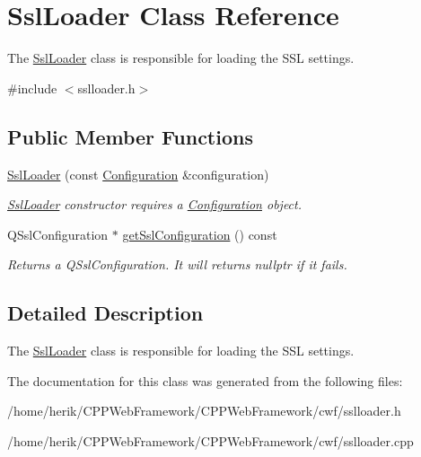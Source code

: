 \hypertarget{class_ssl_loader}{}\section{Ssl\+Loader Class Reference}
\label{class_ssl_loader}


The \hyperlink{class_ssl_loader}{Ssl\+Loader} class is responsible for loading the S\+SL settings.  




{\ttfamily \#include $<$sslloader.\+h$>$}

\subsection*{Public Member Functions}
\begin{DoxyCompactItemize}
\item 
\mbox{\label{class_ssl_loader_aa746ab59f219969f42345c4789be7ce8}} 
\hyperlink{class_ssl_loader_aa746ab59f219969f42345c4789be7ce8}{Ssl\+Loader} (const \hyperlink{class_configuration}{Configuration} \&configuration)
\begin{DoxyCompactList}\small\item\em \hyperlink{class_ssl_loader}{Ssl\+Loader} constructor requires a \hyperlink{class_configuration}{Configuration} object. \end{DoxyCompactList}\item 
\mbox{\label{class_ssl_loader_aec30b251ded2244bfecac5c7be872bce}} 
Q\+Ssl\+Configuration $\ast$ \hyperlink{class_ssl_loader_aec30b251ded2244bfecac5c7be872bce}{get\+Ssl\+Configuration} () const
\begin{DoxyCompactList}\small\item\em Returns a Q\+Ssl\+Configuration. It will returns nullptr if it fails. \end{DoxyCompactList}\end{DoxyCompactItemize}


\subsection{Detailed Description}
The \hyperlink{class_ssl_loader}{Ssl\+Loader} class is responsible for loading the S\+SL settings. 

The documentation for this class was generated from the following files\+:\begin{DoxyCompactItemize}
\item 
/home/herik/\+C\+P\+P\+Web\+Framework/\+C\+P\+P\+Web\+Framework/cwf/sslloader.\+h\item 
/home/herik/\+C\+P\+P\+Web\+Framework/\+C\+P\+P\+Web\+Framework/cwf/sslloader.\+cpp\end{DoxyCompactItemize}
